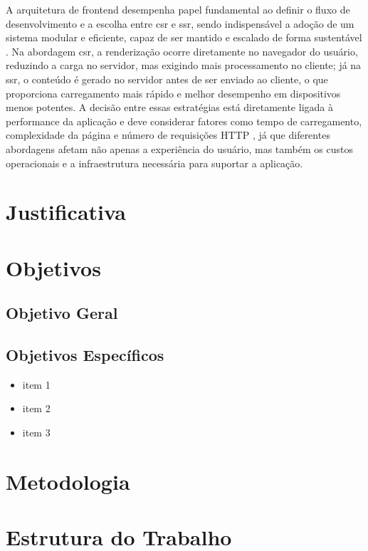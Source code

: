 A arquitetura de frontend desempenha papel fundamental ao definir o fluxo de desenvolvimento e a escolha entre \acrshort{csr} e \acrshort{ssr}, sendo indispensável a adoção de um sistema modular e eficiente, capaz de ser mantido e escalado de forma sustentável \cite{frontendGodbolt}. Na abordagem \acrshort{csr}, a renderização ocorre diretamente no navegador do usuário, reduzindo a carga no servidor, mas exigindo mais processamento no cliente; já na \acrshort{ssr}, o conteúdo é gerado no servidor antes de ser enviado ao cliente, o que proporciona carregamento mais rápido e melhor desempenho em dispositivos menos potentes. A decisão entre essas estratégias está diretamente ligada à performance da aplicação e deve considerar fatores como tempo de carregamento, complexidade da página e número de requisições HTTP \cite{webPerformance}, já que diferentes abordagens afetam não apenas a experiência do usuário, mas também os custos operacionais e a infraestrutura necessária para suportar a aplicação.

\section{Justificativa}


\section{Objetivos}

\subsection{Objetivo Geral}


\subsection{Objetivos Específicos}
\begin{itemize}
\item item 1
\item item 2
\item item 3
\end{itemize}

\section{Metodologia}


\section{Estrutura do Trabalho}

